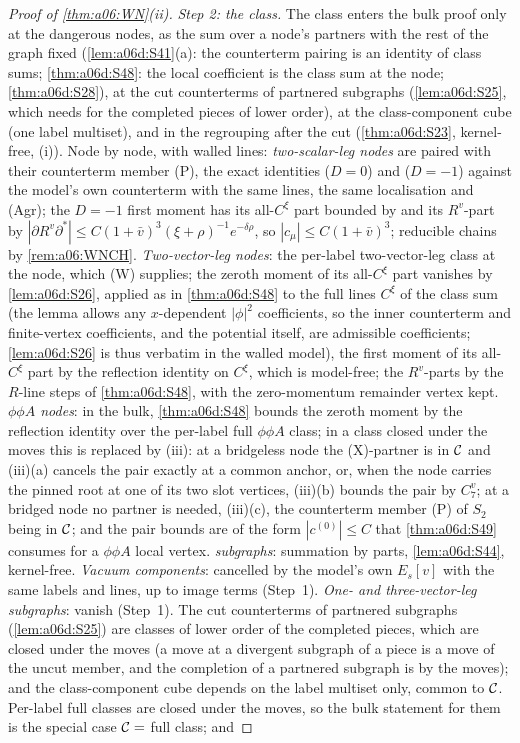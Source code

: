 \begin{proof}[Proof of \cref{thm:a06:WN}\textup{(ii)}]
\emph{Step 2: the class.} The class enters the bulk proof only at the dangerous nodes, as the sum over a node's partners with the rest of the graph fixed (\cref{lem:a06d:S41}(a): the counterterm pairing is an identity of class sums; \cref{thm:a06d:S48}: the local coefficient is the class sum at the node; \cref{thm:a06d:S28}), at the cut counterterms of partnered subgraphs (\cref{lem:a06d:S25}, which needs \cite[(1.33)]{Ba3} for the completed pieces of lower order), at the class-component cube (one label multiset), and in the regrouping after the cut (\cref{thm:a06d:S23}, kernel-free, (i)). Node by node, with walled lines: \emph{two-scalar-leg nodes} are paired with their counterterm member (P), the exact identities \cite[(3.19)]{Ba3} ($D=0$) and \cite[(3.11)]{Ba3} ($D=-1$) against the model's own counterterm with the same lines, the same localisation and (Agr); the $D=-1$ first moment has its all-$C^\xi$ part bounded by \cite[(3.16)]{Ba3} and its $R^v$-part by $|\partial R^v\partial^*|\le C(1+\bar v)^3(\xi+\rho)^{-1}e^{-\delta\rho}$, so $|c_\mu|\le C(1+\bar v)^3$; reducible chains by \cref{rem:a06:WNCH}. \emph{Two-vector-leg nodes}: the per-label two-vector-leg class at the node, which (W) supplies; the zeroth moment of its all-$C^\xi$ part vanishes by \cref{lem:a06d:S26}, applied as in \cref{thm:a06d:S48} to the full lines $C^\xi$ of the class sum (the lemma allows any $x$-dependent $|\phi|^2$ coefficients, so the inner counterterm and finite-vertex coefficients, and the potential itself, are admissible coefficients; \cref{lem:a06d:S26} is thus verbatim in the walled model), the first moment of its all-$C^\xi$ part by the reflection identity \cite[(3.30)]{Ba3} on $C^\xi$, which is model-free; the $R^v$-parts by the $R$-line steps of \cref{thm:a06d:S48}, with the zero-momentum remainder vertex kept. \emph{$\phi\phi A$ nodes}: in the bulk, \cref{thm:a06d:S48} bounds the zeroth moment by the reflection identity \cite[(3.37)]{Ba3} over the per-label full $\phi\phi A$ class; in a class closed under the moves this is replaced by (iii): at a bridgeless node the (X)-partner is in $\mathcal C$ and (iii)(a) cancels the pair exactly at a common anchor, or, when the node carries the pinned root at one of its two slot vertices, (iii)(b) bounds the pair by $C^v_7$; at a bridged node no partner is needed, (iii)(c), the counterterm member (P) of $S_2$ being in $\mathcal C$; and the pair bounds are of the form $|c^{(0)}|\le C$ that \cref{thm:a06d:S49} consumes for a $\phi\phi A$ local vertex. \emph{\cite[(2.4)]{Ba3} subgraphs}: summation by parts, \cref{lem:a06d:S44}, kernel-free. \emph{Vacuum components}: cancelled by the model's own $E_s[v]$ with the same labels and lines, up to image terms (Step~1). \emph{One- and three-vector-leg subgraphs}: vanish (Step~1). The cut counterterms of partnered subgraphs (\cref{lem:a06d:S25}) are classes of lower order of the completed pieces, which are closed under the moves (a move at a divergent subgraph of a piece is a move of the uncut member, and the completion of a partnered subgraph is by the moves); and the class-component cube depends on the label multiset only, common to $\mathcal C$. Per-label full classes are closed under the moves, so the bulk statement for them is the special case $\mathcal C=$ full class; and 
\end{proof}
